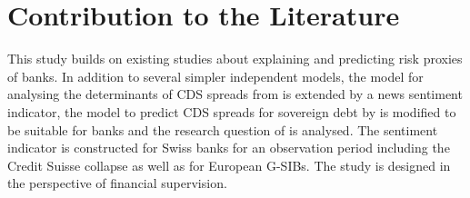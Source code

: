 %


\section{Contribution to the Literature}

This study builds on existing studies about explaining and predicting risk proxies of banks. In addition to several simpler independent models, the model for analysing the determinants of CDS spreads from \cite{annaert2013} is extended by a news sentiment indicator, the model to predict CDS spreads for sovereign debt by \cite{cathcart2020} is modified to be suitable for banks and the research question of \cite{roeder2020} is analysed. The sentiment indicator is constructed for Swiss banks for an observation period including the Credit Suisse collapse as well as for European G-SIBs. The study is designed in the perspective of financial supervision.







\cleardoublepage
